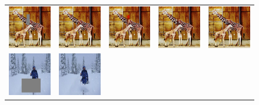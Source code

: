 \begin{figure}[h!]
\centering
\small
\begin{tabular}{ccccc}
\includegraphics[width=.2\textwidth]{figures/random/000000153299_ip.jpg}&
\includegraphics[width=.2\textwidth]{figures/random/000000153299_pm.jpg}&
\includegraphics[width=.2\textwidth]{figures/random/000000153299_sig.jpg}&
\includegraphics[width=.2\textwidth]{figures/random/000000153299_g.jpg}&
\includegraphics[width=.2\textwidth]{figures/random/000000153299.jpg}\\
\includegraphics[width=.2\textwidth]{figures/random/000000266409_ip.jpg}&
\includegraphics[width=.2\textwidth]{figures/random/000000266409_pm.jpg}&

\end{tabular}
\end{figure}
